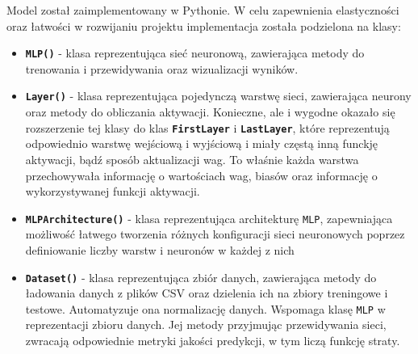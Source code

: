 \documentclass{article}
\begin{document}
Model został zaimplementowany w Pythonie. W celu zapewnienia elastyczności oraz łatwości w rozwijaniu projektu implementacja została podzielona na klasy:
\begin{itemize}
    \item \textbf{\texttt{MLP()}} - klasa reprezentująca sieć neuronową, zawierająca metody do trenowania i przewidywania oraz wizualizacji wyników.
    \item \textbf{\texttt{Layer()}} - klasa reprezentująca pojedynczą warstwę sieci, zawierająca neurony oraz metody do obliczania aktywacji. Konieczne, ale i wygodne okazało się rozszerzenie tej klasy do klas \textbf{\texttt{FirstLayer}} i \textbf{\texttt{LastLayer}}, które reprezentują odpowiednio warstwę wejściową i wyjściową i miały częstą inną funckję aktywacji, bądź sposób aktualizacji wag. To właśnie każda warstwa przechowywała informację o wartościach wag, biasów oraz informację o wykorzystywanej funkcji aktywacji.
    \item \textbf{\texttt{MLPArchitecture()}} - klasa reprezentująca architekturę \texttt{MLP}, zapewniająca możliwość łatwego tworzenia różnych konfiguracji sieci neuronowych poprzez definiowanie liczby warstw i neuronów w każdej z nich
    \item \textbf{\texttt{Dataset()}} - klasa reprezentująca zbiór danych, zawierająca metody do ładowania danych z plików CSV oraz dzielenia ich na zbiory treningowe i testowe. Automatyzuje ona normalizację danych. Wspomaga klasę \texttt{MLP} w reprezentacji zbioru danych. Jej metody przyjmując przewidywania sieci, zwracają odpowiednie metryki jakości predykcji, w tym liczą funkcję straty.
\end{itemize}
\end{document}
